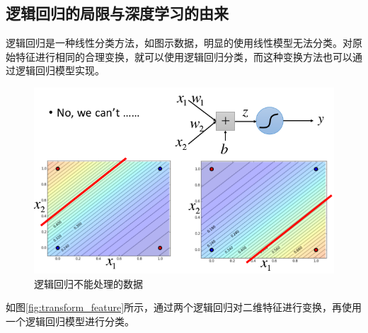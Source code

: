 \subsection{逻辑回归的局限与深度学习的由来}
逻辑回归是一种线性分类方法，如图示数据，明显的使用线性模型无法分类。对原始特征进行相同的合理变换，就可以使用逻辑回归分类，而这种变换方法也可以通过逻辑回归模型实现。
\begin{figure}[htbp]
	\centering
	\includegraphics[scale=0.4]{pic/limition_log_reg}
	\caption{逻辑回归不能处理的数据}
	\label{fig:limition_log_reg}
\end{figure}
如图\ref{fig:transform_feature}所示，通过两个逻辑回归对二维特征进行变换，再使用一个逻辑回归模型进行分类。
